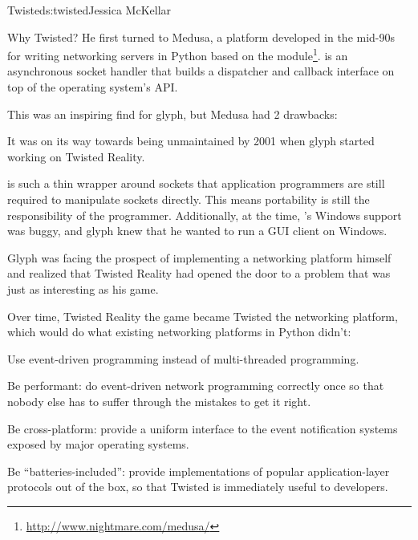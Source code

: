 \begin{aosachapter}{Twisted}{s:twisted}{Jessica McKellar}
\begin{aosasect1}{Why Twisted?}
He first turned to Medusa, a platform developed in the mid-90s for
writing networking servers in Python based on the 
module\footnote{\url{http://www.nightmare.com/medusa/}}. 
is an asynchronous socket handler that builds a dispatcher and
callback interface on top of the operating system's  API.

This was an inspiring find for glyph, but Medusa had 2 drawbacks:

\begin{aosaenumerate}

\item It was on its way towards being unmaintained by 2001 when glyph
  started working on Twisted Reality.

\item {} is such a thin wrapper around sockets that
  application programmers are still required to manipulate sockets
  directly. This means portability is still the responsibility of the
  programmer. Additionally, at the time, 's Windows
  support was buggy, and glyph knew that he wanted to run a GUI client
  on Windows.

\end{aosaenumerate}

Glyph was facing the prospect of implementing a networking platform himself
and realized that Twisted Reality had opened the door to a problem that was just
as interesting as his game.

Over time, Twisted Reality the game became Twisted the networking platform,
which would do what existing networking platforms in Python didn't:

\begin{aosaitemize}

\item Use event-driven programming instead of multi-threaded
  programming.

\item Be performant: do event-driven network programming correctly
  once so that nobody else has to suffer through the mistakes to get
  it right.

\item Be cross-platform: provide a uniform interface to the event
  notification systems exposed by major operating systems.

\item Be ``batteries-included'': provide implementations of popular
  application-layer protocols out of the box, so that Twisted is
  immediately useful to developers.


\end{aosaitemize}
\end{aosasect1}
\end{aosachapter}
